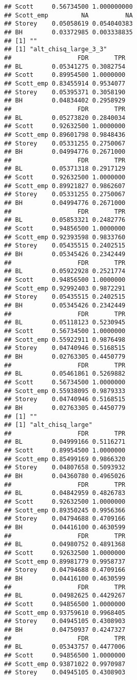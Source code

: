 \documentclass{article}\usepackage[]{graphicx}\usepackage[]{color}
\makeatletter
\newenvironment{kframe}{%
 \def\at@end@of@kframe{}%
 \ifinner\ifhmode%
  \def\at@end@of@kframe{\end{minipage}}%
  \begin{minipage}{\columnwidth}%
 \fi\fi%
 \def\FrameCommand##1{\hskip\@totalleftmargin \hskip-\fboxsep
 \colorbox{shadecolor}{##1}\hskip-\fboxsep
     \hskip-\linewidth \hskip-\@totalleftmargin \hskip\columnwidth}%
 \MakeFramed {\advance\hsize-\width
   \@totalleftmargin\z@ \linewidth\hsize
   \@setminipage}}%
 {\par\unskip\endMakeFramed%
 \at@end@of@kframe}
\newenvironment{knitrout}{}{} %
\makeatother
\begin{document}
\begin{knitrout}
\begin{kframe}
\begin{verbatim}
## Scott     0.56734500 1.000000000
## Scott_emp         NA          NA
## Storey    0.05058619 0.054040383
## BH        0.03372985 0.003338835
## [1] ""
## [1] "alt_chisq_large_3_3"
##                  FDR       TPR
## BL        0.05341275 0.3082754
## Scott     0.89954500 1.0000000
## Scott_emp 0.83455914 0.9534077
## Storey    0.05395371 0.3058190
## BH        0.04834402 0.2958929
##                  FDR       TPR
## BL        0.05273820 0.2840034
## Scott     0.92632500 1.0000000
## Scott_emp 0.89601798 0.9848436
## Storey    0.05331255 0.2750067
## BH        0.04994776 0.2671000
##                  FDR       TPR
## BL        0.05371318 0.2917129
## Scott     0.92632500 1.0000000
## Scott_emp 0.89921827 0.9862607
## Storey    0.05331255 0.2750067
## BH        0.04994776 0.2671000
##                  FDR       TPR
## BL        0.05853321 0.2482776
## Scott     0.94856500 1.0000000
## Scott_emp 0.92393598 0.9833760
## Storey    0.05435515 0.2402515
## BH        0.05345426 0.2342449
##                  FDR       TPR
## BL        0.05922928 0.2521774
## Scott     0.94856500 1.0000000
## Scott_emp 0.92992403 0.9872291
## Storey    0.05435515 0.2402515
## BH        0.05345426 0.2342449
##                  FDR       TPR
## BL        0.05118123 0.5230945
## Scott     0.56734500 1.0000000
## Scott_emp 0.55922911 0.9876498
## Storey    0.04740946 0.5168515
## BH        0.02763305 0.4450779
##                  FDR       TPR
## BL        0.05461861 0.5269882
## Scott     0.56734500 1.0000000
## Scott_emp 0.55938095 0.9879333
## Storey    0.04740946 0.5168515
## BH        0.02763305 0.4450779
## [1] ""
## [1] "alt_chisq_large"
##                  FDR       TPR
## BL        0.04999166 0.5116271
## Scott     0.89954500 1.0000000
## Scott_emp 0.85499169 0.9866320
## Storey    0.04807658 0.5093932
## BH        0.04360780 0.4965026
##                  FDR       TPR
## BL        0.04842959 0.4826783
## Scott     0.92632500 1.0000000
## Scott_emp 0.89350245 0.9956366
## Storey    0.04794688 0.4709166
## BH        0.04416100 0.4630599
##                  FDR       TPR
## BL        0.04980752 0.4891368
## Scott     0.92632500 1.0000000
## Scott_emp 0.89981779 0.9958737
## Storey    0.04794688 0.4709166
## BH        0.04416100 0.4630599
##                  FDR       TPR
## BL        0.04982625 0.4429267
## Scott     0.94856500 1.0000000
## Scott_emp 0.93759610 0.9968405
## Storey    0.04945105 0.4308903
## BH        0.04750937 0.4247327
##                  FDR       TPR
## BL        0.05343757 0.4477006
## Scott     0.94856500 1.0000000
## Scott_emp 0.93871022 0.9970987
## Storey    0.04945105 0.4308903

\end{verbatim}
\end{kframe}
\end{knitrout}
\end{document}
